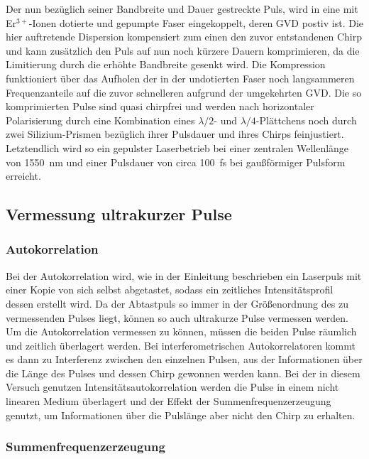       Der nun bezüglich seiner Bandbreite und Dauer gestreckte Puls, wird in eine mit Er$^{3+}$-Ionen dotierte und gepumpte Faser eingekoppelt, deren GVD postiv ist. Die hier auftretende Dispersion 
      kompensiert zum einen den zuvor entstandenen Chirp und kann zusätzlich den Puls auf nun noch kürzere Dauern komprimieren, da die Limitierung durch die erhöhte Bandbreite gesenkt wird. Die
      Kompression funktioniert über das Aufholen der in der undotierten Faser noch langsammeren Frequenzanteile auf die zuvor schnelleren aufgrund der umgekehrten GVD. Die so komprimierten Pulse sind 
      quasi chirpfrei und werden nach horizontaler Polarisierung durch eine Kombination eines $\lambda/2$- und $\lambda/4$-Plättchens noch durch zwei Silizium-Prismen bezüglich ihrer Pulsdauer und ihres 
      Chirps feinjustiert. Letztendlich wird so ein gepulster Laserbetrieb bei einer zentralen Wellenlänge von \SI{1550}{\nano\metre} und einer Pulsdauer von circa \SI{100}{\femto\second} bei gaußförmiger 
      Pulsform erreicht.
      
    
    \subsection{Vermessung ultrakurzer Pulse}
      \subsubsection{Autokorrelation}
        Bei der Autokorrelation wird, wie in der Einleitung beschrieben ein Laserpuls mit einer Kopie von sich selbst abgetastet, sodass ein zeitliches Intensitätsprofil dessen erstellt wird. Da der Abtastpuls
        so immer in der Größenordnung des zu vermessenden Pulses liegt, können so auch ultrakurze Pulse vermessen werden. Um die Autokorrelation vermessen zu können, müssen die beiden Pulse räumlich und
        zeitlich überlagert werden. Bei interferometrischen Autokorrelatoren kommt es dann zu Interferenz zwischen den einzelnen Pulsen, aus der Informationen über die Länge des Pulses und dessen Chirp 
        gewonnen werden kann. Bei der in diesem Versuch genutzen Intensitätsautokorrelation werden die Pulse in einem nicht linearen Medium überlagert und der Effekt der Summenfrequenzerzeugung genutzt, 
        um Informationen über die Pulslänge aber nicht den Chirp zu erhalten.  


      \subsubsection{Summenfrequenzerzeugung}

